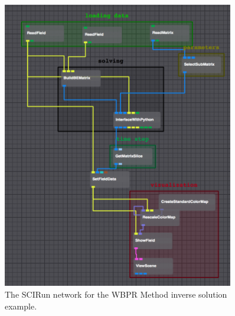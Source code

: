     \begin{figure}
        \begin{center}
        \includegraphics[width=0.9\textwidth]{ECGToolkitGuide_figures/WBPRNetwork.png}
        \caption{The SCIRun network for the WBPR Method inverse solution example.}
        \label{fig:WBPRNetwork}
        \end{center}
    \end{figure}

